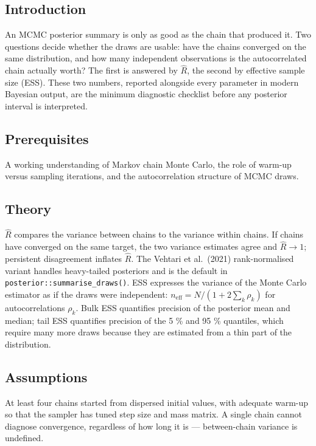 \documentclass[
]{article}
\author{}
\date{\vspace{-2.5em}}
\begin{document}
\subsection{Introduction}\label{introduction}

An MCMC posterior summary is only as good as the chain that produced it.
Two questions decide whether the draws are usable: have the chains
converged on the same distribution, and how many independent
observations is the autocorrelated chain actually worth? The first is
answered by \(\hat R\), the second by effective sample size (ESS). These
two numbers, reported alongside every parameter in modern Bayesian
output, are the minimum diagnostic checklist before any posterior
interval is interpreted.

\subsection{Prerequisites}\label{prerequisites}

A working understanding of Markov chain Monte Carlo, the role of warm-up
versus sampling iterations, and the autocorrelation structure of MCMC
draws.

\subsection{Theory}\label{theory}

\(\hat R\) compares the variance between chains to the variance within
chains. If chains have converged on the same target, the two variance
estimates agree and \(\hat R \to 1\); persistent disagreement inflates
\(\hat R\). The Vehtari et al.~(2021) rank-normalised variant handles
heavy-tailed posteriors and is the default in
\texttt{posterior::summarise\_draws()}. ESS expresses the variance of
the Monte Carlo estimator as if the draws were independent:
\(n_{\text{eff}} = N / (1 + 2 \sum_k \rho_k)\) for autocorrelations
\(\rho_k\). Bulk ESS quantifies precision of the posterior mean and
median; tail ESS quantifies precision of the 5 \% and 95 \% quantiles,
which require many more draws because they are estimated from a thin
part of the distribution.

\subsection{Assumptions}\label{assumptions}

At least four chains started from dispersed initial values, with
adequate warm-up so that the sampler has tuned step size and mass
matrix. A single chain cannot diagnose convergence, regardless of how
long it is --- between-chain variance is undefined.
\end{document}
